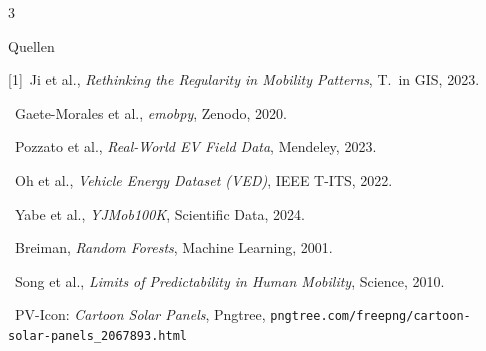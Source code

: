 \documentclass[10pt]{scrartcl}
\begin{document}
\begin{multicols}{3}
\begin{pbox}{Quellen}
{\footnotesize\setlength{\parskip}{0.15em}
[1]~Ji et al., \emph{Rethinking the Regularity in Mobility Patterns}, T.\ in GIS, 2023.\par
[2]~Gaete-Morales et al., \emph{emobpy}, Zenodo, 2020.\par
[3]~Pozzato et al., \emph{Real-World EV Field Data}, Mendeley, 2023.\par
[4]~Oh et al., \emph{Vehicle Energy Dataset (VED)}, IEEE T-ITS, 2022.\par
[5]~Yabe et al., \emph{YJMob100K}, Scientific Data, 2024.\par
[6]~Breiman, \emph{Random Forests}, Machine Learning, 2001.\par
[7]~Song et al., \emph{Limits of Predictability in Human Mobility}, Science, 2010.\par
[8]~PV-Icon: \emph{Cartoon Solar Panels}, Pngtree, \newline \texttt{pngtree.com/freepng/cartoon-solar-panels\_2067893.html}\par}
\end{pbox}

\end{multicols}
\end{document}
